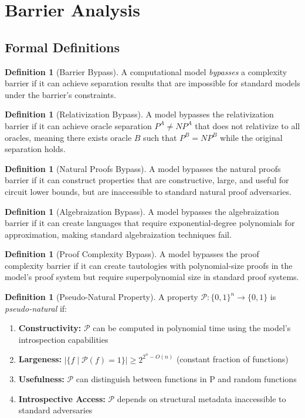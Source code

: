 \documentclass[11pt]{article}
\theoremstyle{definition}
\newtheorem{definition}[theorem]{Definition}
\begin{document}
\section{Barrier Analysis}

\subsection{Formal Definitions}

\begin{definition}[Barrier Bypass]
A computational model \textit{bypasses} a complexity barrier if it can achieve separation results that are impossible for standard models under the barrier's constraints.
\end{definition}

\begin{definition}[Relativization Bypass]
A model bypasses the relativization barrier if it can achieve oracle separation $P^A \neq NP^A$ that does not relativize to all oracles, meaning there exists oracle $B$ such that $P^B = NP^B$ while the original separation holds.
\end{definition}

\begin{definition}[Natural Proofs Bypass]
A model bypasses the natural proofs barrier if it can construct properties that are constructive, large, and useful for circuit lower bounds, but are inaccessible to standard natural proof adversaries.
\end{definition}

\begin{definition}[Algebraization Bypass]
A model bypasses the algebraization barrier if it can create languages that require exponential-degree polynomials for approximation, making standard algebraization techniques fail.
\end{definition}

\begin{definition}[Proof Complexity Bypass]
A model bypasses the proof complexity barrier if it can create tautologies with polynomial-size proofs in the model's proof system but require superpolynomial size in standard proof systems.
\end{definition}

\begin{definition}[Pseudo-Natural Property]
A property $\mathcal{P}: \{0,1\}^n \to \{0,1\}$ is \textit{pseudo-natural} if:
\begin{enumerate}
\item \textbf{Constructivity:} $\mathcal{P}$ can be computed in polynomial time using the model's introspection capabilities
\item \textbf{Largeness:} $|\{f \mid \mathcal{P}(f) = 1\}| \geq 2^{2^n - O(n)}$ (constant fraction of functions)
\item \textbf{Usefulness:} $\mathcal{P}$ can distinguish between functions in $\text{P}$ and random functions
\item \textbf{Introspective Access:} $\mathcal{P}$ depends on structural metadata inaccessible to standard adversaries
\end{enumerate}
\end{definition}
\end{document}
